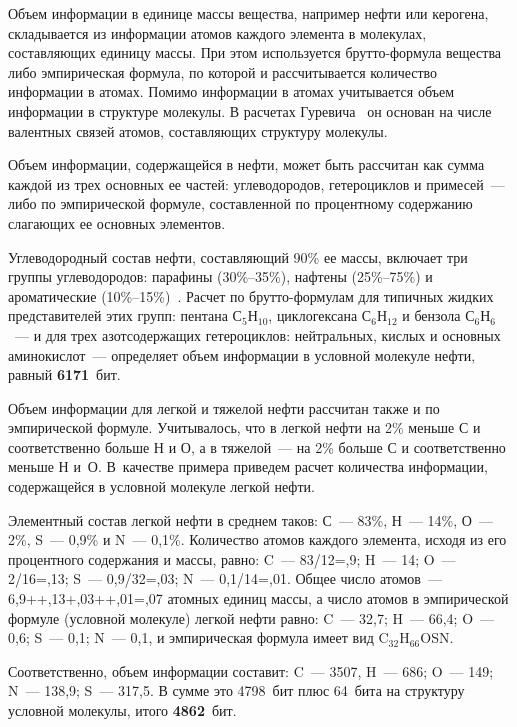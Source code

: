 \begin{multicols}{2}
     Объем информации в единице массы вещества, например нефти или керогена, 
складывается из информации атомов каждого элемента в молекулах, составляющих 
единицу массы. При этом используется брутто-формула вещества либо 
эмпирическая формула, по которой и рассчитывается количество информации в 
атомах. Помимо информации в атомах учитывается объем информации в 
структуре молекулы. В расчетах Гуревича~\cite{8s} он основан на числе 
валентных связей атомов, составляющих структуру молекулы. 
     
     Объем информации, содержащейся в нефти, может быть рассчитан как сумма 
каждой из трех основных ее частей: углеводородов, гетероциклов и примесей~--- либо 
по эмпирической формуле, со\-став\-лен\-ной по процентному содержанию слагающих 
ее основных элементов. 
     
     Углеводородный состав нефти, составляющий 90\% ее массы, включает три 
группы углеводородов: парафины (30\%--35\%), нафтены (25\%--75\%) и 
ароматические (10\%--15\%)~\cite{16s}. Расчет по брутто-фор\-му\-лам для типичных 
жидких представителей этих групп: пентана С$_5$Н$_{10}$, циклогексана 
С$_6$Н$_{12}$ и бензола С$_6$Н$_6$~--- и для трех азотсодержащих гетероциклов: 
нейтральных, кислых и основных аминокислот~--- определяет объем информации в 
условной молекуле нефти, равный \textbf{6171}~бит.
     
     Объем информации для легкой и тяжелой нефти рассчитан также и по 
эмпирической формуле. Учитывалось, что в легкой нефти на 2\% меньше С и 
соответственно больше Н и О, а в тяжелой~--- на 2\% больше С и соответственно 
меньше Н и~О. В~качестве примера приведем расчет количества информации, 
содержащейся в условной молекуле легкой нефти.
     
     Элементный состав легкой нефти в среднем таков: С~--- 83\%, Н~--- 14\%, 
О~--- 2\%, S~--- 0,9\% и N~--- 0,1\%. Количество атомов каждого элемента, исходя из его 
процентного содержания и массы, равно: 
C~--- 83/12\;=,9; H~--- 14; O~--- 2/16\;=,13;
S~--- 0{,}9/32\;=,03; N~--- 0,1/14\;=,01.
     Общее число атомов~--- 6,9\;+\;+,13\;+,03\;+\linebreak +,01\;=,07 атомных 
единиц массы, а число атомов в эмпирической формуле (условной молекуле) 
легкой нефти равно:
     C~--- 32,7; H~--- 66,4; O~--- 0,6; S~--- 0,1; N~--- 0,1, и эмпирическая формула 
имеет вид C$_{32}$H$_{66}$OSN.
     
     Соответственно, объем информации составит:
     C~--- 3507, H~--- 686; O~--- 149; N~--- 138,9; S~--- 317,5. В сумме это 
4798~бит плюс 64~бита на структуру условной молекулы, итого \textbf{4862}~бит. 
     

\end{multicols}
